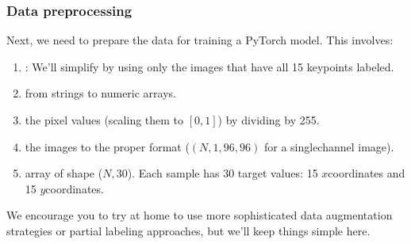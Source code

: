 \documentclass[letterpaper,10pt,english]{jupyterBook}
\begin{document}
\subsubsection{Data preprocessing}
\label{\detokenize{04:data-preprocessing}}
\sphinxAtStartPar
Next, we need to prepare the data for training a PyTorch model. This involves:
\begin{enumerate}
%
\item {} 
\sphinxAtStartPar
{}: We’ll simplify by using only the images that have all 15 keypoints labeled.

\item {} 
\sphinxAtStartPar
{} from strings to numeric arrays.

\item {} 
\sphinxAtStartPar
{} the pixel values (scaling them to \([0,1]\)) by dividing by 255.

\item {} 
\sphinxAtStartPar
{} the images to the proper format (\( (N, 1, 96, 96) \) for a single\sphinxhyphen{}channel image).

\item {} 
\sphinxAtStartPar
{} array of shape (\( N, 30 \)). Each sample has 30 target values: 15 \( x \)\sphinxhyphen{}coordinates and 15 \( y \)\sphinxhyphen{}coordinates.

\end{enumerate}

\sphinxAtStartPar
We encourage you to try at home to use more sophisticated data augmentation strategies or partial labeling approaches, but we’ll keep things simple here.
\end{document}
